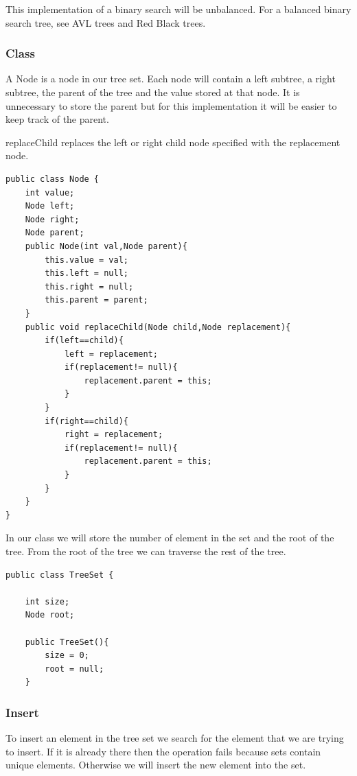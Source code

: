 \documentclass[11pt,oneside]{book}
\begin{document}
This implementation of a binary search will be unbalanced. For a balanced binary search tree, see AVL trees and Red Black trees.

\subsubsection{Class}

A Node is a node in our tree set. Each node will contain a left subtree, a right subtree, the parent of the tree and the value stored at that node. It is unnecessary to store the parent but for this implementation it will be easier to keep track of the parent.

replaceChild replaces the left or right child node specified with the replacement node.

\begin{lstlisting}
public class Node {
    int value;
    Node left;
    Node right;
    Node parent;
    public Node(int val,Node parent){
        this.value = val;
        this.left = null;
        this.right = null;
        this.parent = parent;
    }
    public void replaceChild(Node child,Node replacement){
        if(left==child){
            left = replacement;
            if(replacement!= null){
                replacement.parent = this;
            }
        }
        if(right==child){
            right = replacement;
            if(replacement!= null){
                replacement.parent = this;
            }
        }
    }
}
\end{lstlisting}

In our class we will store the number of element in the set and the root of the tree. From the root of the tree we can traverse the rest of the tree.

\begin{lstlisting}
public class TreeSet {

    int size;
    Node root;
    
    public TreeSet(){
        size = 0;
        root = null;
    }
\end{lstlisting}

\subsubsection{Insert}

To insert an element in the tree set we search for the element that we are trying to insert. If it is already there then the operation fails because sets contain unique elements. Otherwise we will insert the new element into the set.
\end{document}

